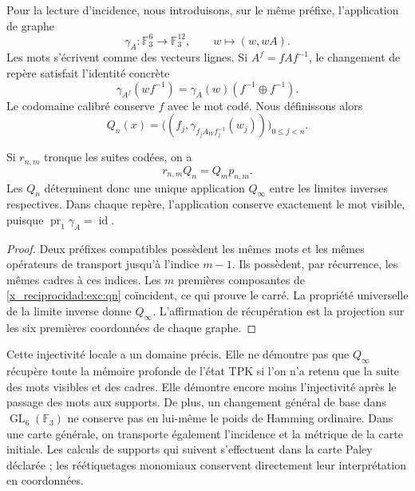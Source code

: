 Pour la lecture d'incidence, nous introduisons, sur le même préfixe, l'application de graphe
\begin{equation}
 \gamma_A:\mathbb F_3^6\longrightarrow\mathbb F_3^{12},
 \qquad w\longmapsto(w,wA).
 \label{x_reciprocidad:exc:gamma}
\end{equation}
Les mots s'écrivent comme des vecteurs lignes. Si $A^f=fAf^{-1}$, le changement de repère satisfait l'identité concrète
\begin{equation}
 \gamma_{A^f}(wf^{-1})
   =\gamma_A(w)(f^{-1}\oplus f^{-1}).
 \label{x_reciprocidad:exc:covariancia}
\end{equation}
Le codomaine calibré conserve $f$ avec le mot codé.
Nous définissons alors
\begin{equation}
 Q_n(x)=\bigl((f_j,\gamma_{f_jA_Wf_j^{-1}}(w_j))\bigr)_{0\leq j<n}.
 \label{x_reciprocidad:exc:qn}
\end{equation}

\begin{proposition}
\label{x_reciprocidad:exc:limite-inverso}
Si $r_{n,m}$ tronque les suites codées, on a
\[
 r_{n,m}Q_n=Q_m p_{n,m}.
\]
Les $Q_n$ déterminent donc une unique application $Q_\infty$ entre les limites inverses respectives. Dans chaque repère, l'application conserve exactement le mot visible, puisque $\operatorname{pr}_1\gamma_A=\operatorname{id}$.
\end{proposition}

\begin{proof}
Deux préfixes compatibles possèdent les mêmes mots et les mêmes
opérateurs de transport jusqu'à l'indice $m-1$. Ils possèdent, par récurrence,
les mêmes cadres à ces indices. Les $m$ premières composantes de
\eqref{x_reciprocidad:exc:qn} coïncident, ce qui prouve le carré. La propriété
universelle de la limite inverse donne $Q_\infty$. L'affirmation de récupération
est la projection sur les six premières coordonnées de chaque graphe.
\end{proof}

Cette injectivité locale a un domaine précis. Elle ne démontre pas que
$Q_\infty$ récupère toute la mémoire profonde de l'état TPK si l'on n'a
retenu que la suite des mots visibles et des cadres. Elle démontre encore moins
l'injectivité après le passage des mots aux supports.
De plus, un changement général de base dans $\operatorname{GL}_6(\mathbb F_3)$
ne conserve pas en lui-même le poids de Hamming ordinaire. Dans une carte
générale, on transporte également l'incidence et la métrique de la carte
initiale. Les calculs de supports qui suivent s'effectuent dans la carte
Paley déclarée ; les réétiquetages monomiaux conservent directement leur
interprétation en coordonnées.

